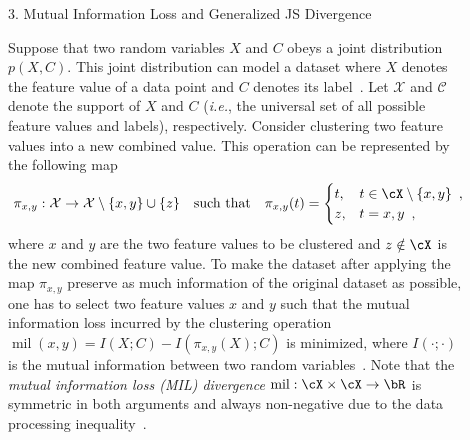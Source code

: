 \documentclass[final]{beamer}
\DeclareMathOperator{\pr}{Pr}
\DeclareMathOperator{\mil}{mil}
\newcommand{\ie}{\emph{i.e.}\xspace}
\newlength{\sepwid}
\newlength{\onecolwid}
\begin{document}
\begin{frame}[t]
\begin{columns}[t]
\begin{column}{\onecolwid}
		\end{column} %
 		\begin{column}{\sepwid}\end{column} %
\begin{column}{\onecolwid} %
\vspace{-40pt}

\begin{block}{3. Mutual Information Loss and Generalized JS 
		Divergence}
	
	Suppose that two random variables $ X $ and $ C $ obeys a joint 
	distribution $ p(X,C) $. This joint distribution can model a dataset where 
	$ X $ denotes the feature value of a data point and $ C $ denotes its 
	label~\citep{bateni2019categorical}.
	Let $\mathcal{X}$ and $\mathcal{C}$ denote the support of $X$ and $C$ (\ie, 
	the 
	universal set of all possible feature values and labels), respectively. 
	Consider clustering two feature values into a new combined value. This 
	operation can be represented by the following map 
	\[ 
	\pi_{x,y}: \mathcal{X}\to \mathcal{X}\setminus\{x,y\}\cup 
	\{z\}\quad\text{such that}\quad \pi_{x,y}(t) = \begin{cases}
	t, & t\in \cX\setminus \{x, y\}\enspace,\\
	z, & t = x,y\enspace,
	\end{cases}
	\]
	where $x$ and $y$ are the two feature values to be clustered and $z\notin 
	\cX$ 
	is the new combined feature value. To make the dataset after applying the 
	map 
	$\pi_{x,y}$ preserve as much information of the original dataset as 
	possible, 
	one has to select two feature values $x$ and $y$ such that the mutual 
	information loss incurred by the clustering operation
	$
	\mil(x,y) = I(X;C) - I(\pi_{x,y}(X);C)
	$
	is minimized,
	where $I(\cdot;\cdot)$ is the mutual information between two random 
	variables~\cite{cover2012elements}. 
	Note that the \emph{mutual information loss (MIL) divergence} $ 
	\mil:\cX\times\cX\to\bR $ is symmetric in both arguments and always 
	non-negative due to the data processing 
	inequality~\citep{cover2012elements}.
	

\end{block}
\end{column}
\end{columns}
\end{frame}
\end{document}
